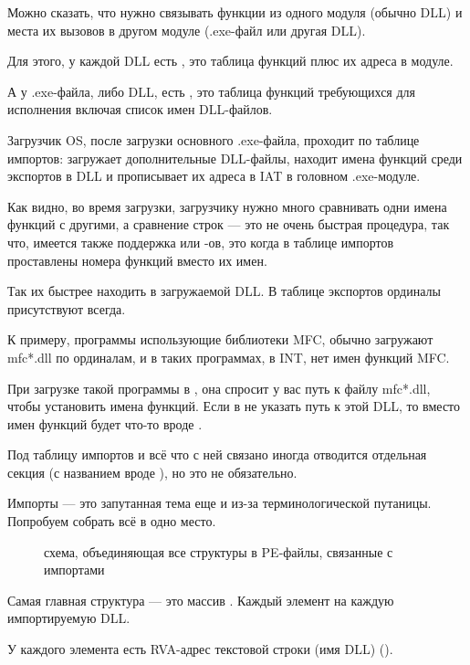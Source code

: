 Можно сказать, что нужно связывать функции из одного модуля (обычно DLL) и места их вызовов в другом модуле (.exe-файл или другая DLL).

Для этого, у каждой DLL есть , это таблица функций плюс их адреса в модуле.

А у .exe-файла, либо DLL, есть , это таблица функций требующихся для исполнения
включая список имен DLL-файлов.

Загрузчик \ac{OS}, после загрузки основного .exe-файла, проходит по таблице импортов:
загружает дополнительные DLL-файлы, 
находит имена функций среди экспортов в DLL и прописывает их адреса в \ac{IAT} в головном .exe-модуле.

Как видно, во время загрузки, загрузчику нужно много сравнивать одни имена функций с другими,
а сравнение строк --- это не очень быстрая процедура, так что,
имеется также поддержка  или
-ов, это когда в таблице импортов проставлены номера функций вместо их имен.

Так их быстрее находить в загружаемой DLL.
В таблице экспортов ординалы присутствуют всегда.

К примеру, программы использующие библиотеки \ac{MFC}, обычно загружают mfc*.dll по ординалам, и в таких программах, в \ac{INT}, нет имен функций \ac{MFC}.

При загрузке такой программы в \IDA, она спросит у вас путь к файлу mfc*.dll,
чтобы установить имена функций.
Если в \IDA не указать путь к этой DLL, то вместо имен функций будет что-то вроде .


Под таблицу импортов и всё что с ней связано иногда отводится отдельная секция 
(с названием вроде ),
но это не обязательно.

Импорты --- это запутанная тема еще и из-за терминологической путаницы. Попробуем собрать всё в одно место.

\begin{figure}[H]
\centering
{}
\caption{схема, объединяющая все структуры в PE-файлы, связанные с импортами}
\end{figure}

Самая главная структура --- это массив .
Каждый элемент на каждую импортируемую DLL.

У каждого элемента есть \ac{RVA}-адрес текстовой строки (имя DLL) ().

